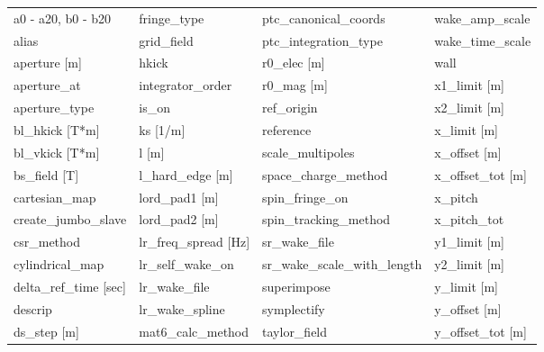  \begin{tabular}{llll} \toprule
a0 - a20, b0 - b20             & fringe_type                    & ptc_canonical_coords           & wake_amp_scale                 \\
alias                          & grid_field                     & ptc_integration_type           & wake_time_scale                \\
aperture [m]                   & hkick                          & r0_elec [m]                    & wall                           \\
aperture_at                    & integrator_order               & r0_mag [m]                     & x1_limit [m]                   \\
aperture_type                  & is_on                          & ref_origin                     & x2_limit [m]                   \\
bl_hkick [T*m]                 & ks [1/m]                       & reference                      & x_limit [m]                    \\
bl_vkick [T*m]                 & l [m]                          & scale_multipoles               & x_offset [m]                   \\
bs_field [T]                   & l_hard_edge [m]                & space_charge_method            & x_offset_tot [m]               \\
cartesian_map                  & lord_pad1 [m]                  & spin_fringe_on                 & x_pitch                        \\
create_jumbo_slave             & lord_pad2 [m]                  & spin_tracking_method           & x_pitch_tot                    \\
csr_method                     & lr_freq_spread [Hz]            & sr_wake_file                   & y1_limit [m]                   \\
cylindrical_map                & lr_self_wake_on                & sr_wake_scale_with_length      & y2_limit [m]                   \\
delta_ref_time [sec]           & lr_wake_file                   & superimpose                    & y_limit [m]                    \\
descrip                        & lr_wake_spline                 & symplectify                    & y_offset [m]                   \\
ds_step [m]                    & mat6_calc_method               & taylor_field                   & y_offset_tot [m]               \\

\end{tabular}
